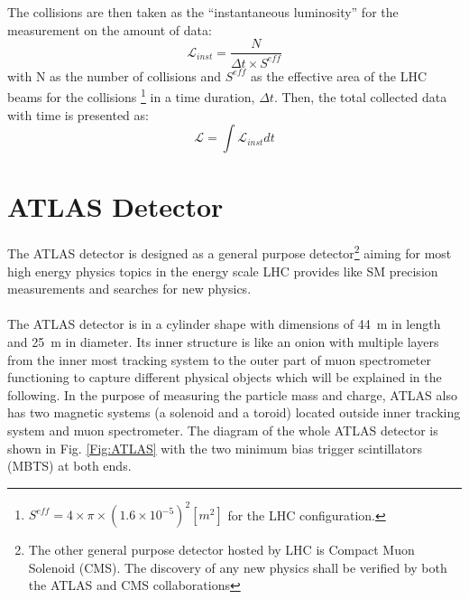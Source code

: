 \\
\\The collisions are then taken as the ``instantaneous luminosity'' for the measurement on the amount of data:
\begin{equation}
\mathcal{L}_{inst} = \frac{N}{\Delta t\times S^{eff}}
\end{equation}
with N as the number of collisions and $S^{eff}$ as the effective area of the LHC beams for the collisions \footnote{$S^{eff}=4\times\pi\times(1.6\times 10^{-5})^2[m^2]$ for the LHC configuration.} in a time duration, $\Delta t$. Then, the total collected data with time is presented as:
\begin{equation}
\mathcal{L} = \int \mathcal{L}_{inst}dt
\end{equation} 
\section{ATLAS Detector}
The ATLAS detector  \cite{Airapetian:391176} is designed as a general purpose detector\footnote{The other general purpose detector hosted by LHC is Compact Muon Solenoid (CMS). The discovery of any new physics shall be verified by both the ATLAS and CMS collaborations} aiming for most high energy physics topics in the energy scale LHC provides like SM precision measurements and searches for new physics.
\\
\\The ATLAS detector is in a cylinder shape with dimensions of 44~m in length and 25~m in diameter. Its inner structure is like an onion with multiple layers from the inner most tracking system to the outer part of muon spectrometer functioning to capture different physical objects which will be explained in the following. In the purpose of measuring the particle mass and charge, ATLAS also has two magnetic systems (a solenoid and a toroid) located outside inner tracking system and muon spectrometer. The diagram of the whole ATLAS detector is shown in Fig. \ref{Fig:ATLAS} with the two minimum bias trigger scintillators (MBTS) at both ends.

